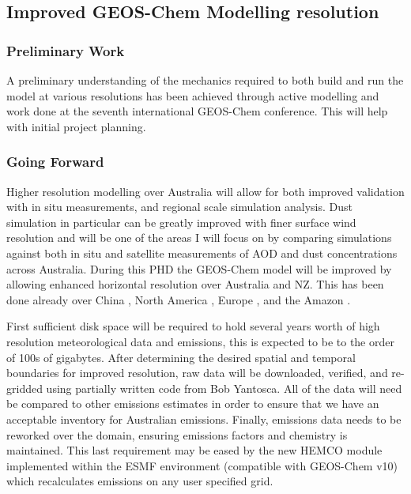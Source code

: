 \subsection{Improved GEOS-Chem Modelling resolution}
\subsubsection{Preliminary Work}
A preliminary understanding of the mechanics required to both build and run the model at various resolutions has been achieved through active modelling and work done at the seventh international GEOS-Chem conference.
This will help with initial project planning.

\subsubsection{Going Forward}
Higher resolution modelling over Australia will allow for both improved validation with in situ measurements, and regional scale simulation analysis. 
Dust simulation in particular can be greatly improved with finer surface wind resolution and will be one of the areas I will focus on by comparing simulations against both in situ and satellite measurements of AOD and dust concentrations across Australia.
During this PHD the GEOS-Chem model will be improved by allowing enhanced horizontal resolution over Australia and NZ.
This has been done already over China \cite{Chen_2009,Wang_2004}, North America \cite{Zhang_2012}, Europe \cite{Protonotariou_2013}, and the Amazon \cite{Barkley_2013}.

First sufficient disk space will be required to hold several years worth of high resolution meteorological data and emissions, this is expected to be to the order of 100s of gigabytes.
After determining the desired spatial and temporal boundaries for improved resolution, raw data will be downloaded, verified, and re-gridded using partially written code from Bob Yantosca.
All of the data will need be compared to other emissions estimates in order to ensure that we have an acceptable inventory for Australian emissions.
Finally, emissions data needs to be reworked over the domain, ensuring emissions factors and chemistry is maintained.
This last requirement may be eased by the new HEMCO module implemented within the ESMF environment (compatible with GEOS-Chem v10) which recalculates emissions on any user specified grid.
  